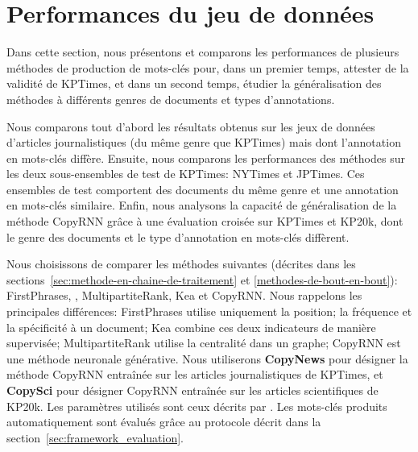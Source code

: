 
\section{Performances du jeu de données}\label{sec:kptimes_valid}

%

Dans cette section, nous présentons et comparons les performances de plusieurs méthodes de production de mots-clés pour, dans un premier temps, attester de la validité de KPTimes, et dans un second temps, étudier la généralisation des méthodes à différents genres de documents et types d'annotations.

Nous comparons tout d'abord les résultats obtenus sur les jeux de données d'articles journalistiques (du même genre que KPTimes) mais dont l'annotation en mots-clés diffère.
Ensuite, nous comparons les performances des méthodes sur les deux sous-ensembles de test de KPTimes: NYTimes et JPTimes.
Ces ensembles de test comportent des documents du même genre et une annotation en mots-clés similaire.
Enfin, nous analysons la capacité de généralisation de la méthode CopyRNN grâce à une évaluation croisée sur KPTimes et KP20k, dont le genre des documents et le type d'annotation en mots-clés diffèrent.

Nous choisissons de comparer les méthodes suivantes (décrites dans les sections~\ref{sec:methode-en-chaine-de-traitement} et \ref{methodes-de-bout-en-bout}): FirstPhrases, \tfidf{}, MultipartiteRank, Kea et CopyRNN. Nous rappelons les principales différences: FirstPhrases utilise uniquement la position; \tfidf{} la fréquence et la spécificité à un document; Kea combine ces deux indicateurs de manière supervisée; MultipartiteRank utilise la centralité dans un graphe; CopyRNN est une méthode neuronale générative. Nous utiliserons \textbf{CopyNews} pour désigner la méthode CopyRNN entraînée sur les articles journalistiques de KPTimes, et \textbf{CopySci} pour désigner CopyRNN entraînée sur les articles scientifiques de KP20k. Les paramètres utilisés sont ceux décrits par \citet{meng_deep_2017}.
Les mots-clés produits automatiquement sont évalués grâce au protocole décrit dans la section~\ref{sec:framework_evaluation}.


